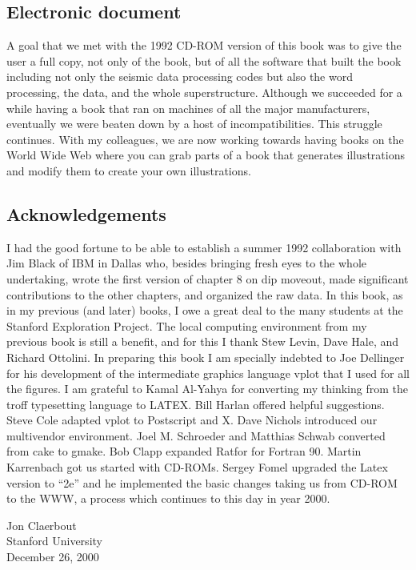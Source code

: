 \subsection*{Electronic document}

A goal that we met with the 1992 CD-ROM version of this book was to
give the user a full copy, not only of the book, but of all the
software that built the book including not only the seismic data
processing codes but also the word processing, the data, and the whole
superstructure.  Although we succeeded for a while having a book that
ran on machines of all the major manufacturers, eventually we were
beaten down by a host of incompatibilities. This struggle
continues. With my colleagues, we are now working towards having books
on the World Wide Web where you can grab parts of a book that
generates illustrations and modify them to create your own
illustrations.

\subsection*{Acknowledgements}

I had the good fortune to be able to establish a summer 1992
collaboration with Jim Black of IBM in Dallas who, besides bringing
fresh eyes to the whole undertaking, wrote the first version of
chapter 8 on dip moveout, made significant contributions to the other
chapters, and organized the raw data.  In this book, as in my previous
(and later) books, I owe a great deal to the many students at the
Stanford Exploration Project. The local computing environment from my
previous book is still a benefit, and for this I thank Stew Levin,
Dave Hale, and Richard Ottolini. In preparing this book I am specially
indebted to Joe Dellinger for his development of the intermediate
graphics language vplot that I used for all the figures. I am grateful
to Kamal Al-Yahya for converting my thinking from the troff
typesetting language to LATEX. Bill Harlan offered helpful
suggestions. Steve Cole adapted vplot to Postscript and X. Dave
Nichols introduced our multivendor environment. Joel M. Schroeder and
Matthias Schwab converted from cake to gmake. Bob Clapp expanded
Ratfor for Fortran 90. Martin Karrenbach got us started with
CD-ROMs. Sergey Fomel upgraded the Latex version to “2e” and he
implemented the basic changes taking us from CD-ROM to the WWW, a
process which continues to this day in year 2000.

\noindent Jon Claerbout \\
Stanford University \\
December 26, 2000